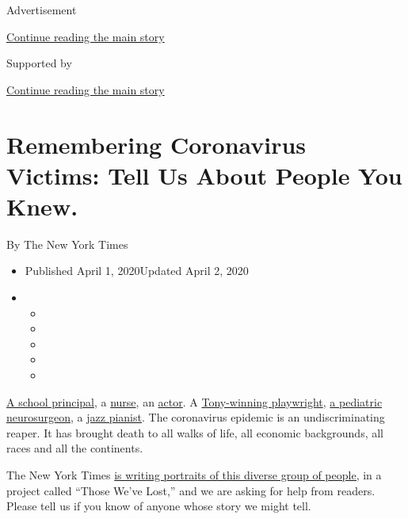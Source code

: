 Advertisement

\protect\hyperlink{after-top}{Continue reading the main story}

Supported by

\protect\hyperlink{after-sponsor}{Continue reading the main story}

\hypertarget{remembering-coronavirus-victims-tell-us-about-people-you-knew}{%
\section{Remembering Coronavirus Victims: Tell Us About People You
Knew.}\label{remembering-coronavirus-victims-tell-us-about-people-you-knew}}

By The New York Times

\begin{itemize}
\item
  Published April 1, 2020Updated April 2, 2020
\item
  \begin{itemize}
  \item
  \item
  \item
  \item
  \item
  \end{itemize}
\end{itemize}

\href{https://www.nytimes.com/2020/03/27/obituaries/arnold-obey-dead-coronavirus.html}{A
school principal}, a
\href{https://www.nytimes.com/2020/03/31/obituaries/kious-kelly-dead-coronavirus.html}{nurse},
an
\href{https://www.nytimes.com/2020/03/27/theater/mark-blum-dead-coronavirus.html}{actor}.
A
\href{https://www.nytimes.com/2020/03/24/theater/terrence-mcnally-dead-coronavirus.html}{Tony-winning
playwright},
\href{https://www.nytimes.com/2020/04/01/obituaries/dr-james-t-goodrich-dead-coronavirus.html}{a
pediatric neurosurgeon}, a
\href{https://www.nytimes.com/2020/03/28/arts/music/mike-longo-dead-coronavirus.html}{jazz
pianist}. The coronavirus epidemic is an undiscriminating reaper. It has
brought death to all walks of life, all economic backgrounds, all races
and all the continents.

The New York Times
\href{https://www.nytimes.com/series/people-died-coronavirus-obituaries}{is
writing portraits of this diverse group of people,} in a project called
``Those We've Lost,'' and we are asking for help from readers. Please
tell us if you know of anyone whose story we might tell.

